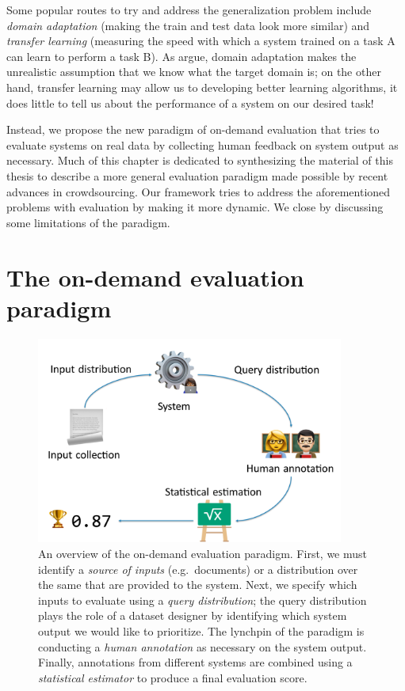 Some popular routes to try and address the generalization problem include \textit{domain adaptation} (making the train and test data look more similar) and \textit{transfer learning} (measuring the speed with which a system trained on a task A can learn to perform a task B).
As \citet{plank16nonstandard} argue, domain adaptation makes the unrealistic assumption that we know what the target domain is;
  on the other hand, transfer learning may allow us to developing better learning algorithms, it does little to tell us about the performance of a system on our desired task!

Instead, we propose the new paradigm  of on-demand evaluation that tries to evaluate systems on real data by collecting human feedback on system output as necessary.
Much of this chapter is dedicated to synthesizing the material of this thesis to describe a more general evaluation paradigm made possible by recent advances in crowdsourcing.
Our framework tries to address the aforementioned problems with evaluation by making it more dynamic.
We close by discussing some limitations of the paradigm.

\section{The on-demand evaluation paradigm}

\begin{figure}
  \centering
  \includegraphics[width=0.9\textwidth]{figures/overview}
  \caption[Overview of the on-demand evaluation paradigm]{\label{fig:conclusions:overview}
  An overview of the on-demand evaluation paradigm. 
  First, we must  identify a \textit{source of inputs} (e.g.\ documents) or a distribution over the same that are provided to the system.
  Next, we specify which inputs to evaluate using a \textit{query distribution}; the query distribution plays the role of a dataset designer by identifying which system output we would like to prioritize.
  The lynchpin of the paradigm is conducting a \textit{human annotation} as necessary on the system output. 
  Finally, annotations from different systems are combined using a \textit{statistical estimator} to produce a final evaluation score.
  }
\end{figure}

